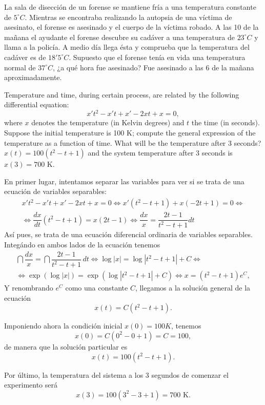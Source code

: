 {La sala de disección de un forense se mantiene fría a una temperatura constante de $5^\circ C$. Mientras se encontraba
realizando la autopsia de una víctima de asesinato, el forense es asesinado y el cuerpo de la víctima robado. A las 10
de la mañana el ayudante el forense descubre su cadáver a una temperatura de $23^\circ C$ y llama a la policía. A medio
día llega ésta y comprueba que la temperatura del cadáver es de $18'5^\circ C$. Supuesto que el forense tenía en vida
una temperatura normal de $37^\circ C$, ¿a qué hora fue asesinado?}
{Fue asesinado a las 6 de la mañana aproximadamente.
}
{}



{Temperature and time, during certain process, are related by the following differential equation:
\[
x't^2-x't+x'-2xt+x=0,
\]
where $x$ denotes the temperature (in Kelvin degrees) and $t$ the time (in seconds).
Suppose the initial temperature is 100 K; compute the general expression of the temperature as a function of time. What will be the temperature after 3 seconds?}
{$x(t)=100(t^2-t+1)$ and the system temperature after 3 seconds is $x(3)=700$ K.
}
{En primer lugar, intentamos separar las variables para ver si se trata de una ecuación de variables separables:
\[\renewcommand{\arraystretch}{2}
\begin{array}{c}
x't^2  - x't + x' - 2xt + x = 0 \Leftrightarrow x'(t^2-t+1)+x(-2t+1)=0 \Leftrightarrow\\
\Leftrightarrow \dfrac{dx}{dt}(t^2-t+1)=x(2t-1) \Leftrightarrow \dfrac{dx}{x}=\dfrac{2t-1}{t^2-t+1} dt
\end{array}
\]
Así pues, se trata de una ecuación diferencial ordinaria de variables separables. Integándo en ambos lados de la
ecuación tenemos
\[\renewcommand{\arraystretch}{2}
\begin{array}{c}
\dint \dfrac{dx}{x}=\dint \dfrac{2t-1}{t^2-t+1}\,dt \Leftrightarrow \log |x|= \log |t^2-t+1|+C \Leftrightarrow \\
\Leftrightarrow \exp(\log |x| )= \exp(\log |t^2-t+1|+C) \Leftrightarrow x=(t^2-t+1)e^C,
\end{array}
\]
Y renombrando $e^C$ como una constante $C$, llegamos a la solución general de la ecuación
\[
x(t)=C(t^2-t+1).
\]

Imponiendo ahora la condición inicial $x(0)=100 K$, tenemos
\[
x(0)=C(0^2-0+1)=C=100,
\]
de manera que la solución particular es
\[
x(t)=100(t^2-t+1).
\]

Por último, la temperatura del sistema a los 3 segundos de comenzar el experimento será
\[
x(3)=100(3^2-3+1)=700\textrm{ K}.
\]
}


